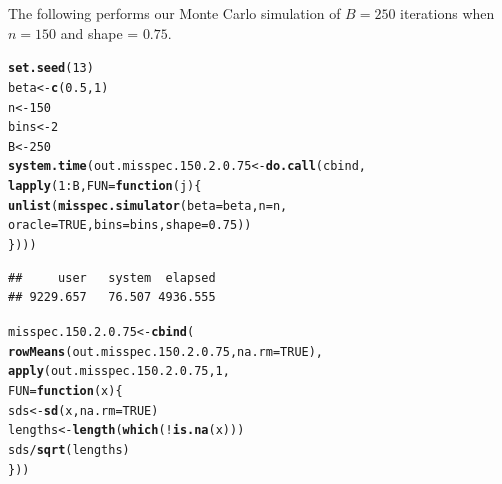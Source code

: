 \documentclass[11pt]{article}\usepackage[]{graphicx}\usepackage[]{color}
\makeatletter
\newcommand{\hlnum}[1]{\textcolor[rgb]{0.686,0.059,0.569}{#1}}%
\newcommand{\hlopt}[1]{\textcolor[rgb]{0,0,0}{#1}}%
\newcommand{\hlstd}[1]{\textcolor[rgb]{0.345,0.345,0.345}{#1}}%
\newcommand{\hlkwa}[1]{\textcolor[rgb]{0.161,0.373,0.58}{\textbf{#1}}}%
\newcommand{\hlkwb}[1]{\textcolor[rgb]{0.69,0.353,0.396}{#1}}%
\newcommand{\hlkwc}[1]{\textcolor[rgb]{0.333,0.667,0.333}{#1}}%
\newcommand{\hlkwd}[1]{\textcolor[rgb]{0.737,0.353,0.396}{\textbf{#1}}}%
\newenvironment{kframe}{%
 \def\at@end@of@kframe{}%
 \ifinner\ifhmode%
  \def\at@end@of@kframe{\end{minipage}}%
  \begin{minipage}{\columnwidth}%
 \fi\fi%
 \def\FrameCommand##1{\hskip\@totalleftmargin \hskip-\fboxsep
 \colorbox{shadecolor}{##1}\hskip-\fboxsep
     \hskip-\linewidth \hskip-\@totalleftmargin \hskip\columnwidth}%
 \MakeFramed {\advance\hsize-\width
   \@totalleftmargin\z@ \linewidth\hsize
   \@setminipage}}%
 {\par\unskip\endMakeFramed%
 \at@end@of@kframe}
\newenvironment{knitrout}{}{} %
\makeatother
\begin{document}

The following performs our Monte Carlo simulation of $B = 250$ iterations 
when $n = 150$ and shape = $0.75$.

\begin{knitrout}
\color{fgcolor}\begin{kframe}
\begin{alltt}
\hlkwd{set.seed}\hlstd{(}\hlnum{13}\hlstd{)}
\hlstd{beta} \hlkwb{<-} \hlkwd{c}\hlstd{(}\hlnum{0.5}\hlstd{,} \hlnum{1}\hlstd{)}
\hlstd{n} \hlkwb{<-} \hlnum{150}
\hlstd{bins} \hlkwb{<-} \hlnum{2}
\hlstd{B} \hlkwb{<-} \hlnum{250}
\hlkwd{system.time}\hlstd{(out.misspec.150.2.0.75} \hlkwb{<-} \hlkwd{do.call}\hlstd{(cbind,}
  \hlkwd{lapply}\hlstd{(}\hlnum{1}\hlopt{:}\hlstd{B,} \hlkwc{FUN} \hlstd{=} \hlkwa{function}\hlstd{(}\hlkwc{j}\hlstd{)\{}
    \hlkwd{unlist}\hlstd{(}\hlkwd{misspec.simulator}\hlstd{(}\hlkwc{beta} \hlstd{= beta,} \hlkwc{n} \hlstd{= n,}
      \hlkwc{oracle} \hlstd{=} \hlnum{TRUE}\hlstd{,} \hlkwc{bins} \hlstd{= bins,} \hlkwc{shape} \hlstd{=} \hlnum{0.75}\hlstd{))}
\hlstd{\})))}
\end{alltt}
\begin{verbatim}
##     user   system  elapsed 
## 9229.657   76.507 4936.555
\end{verbatim}
\end{kframe}
\end{knitrout}

\begin{knitrout}
\color{fgcolor}\begin{kframe}
\begin{alltt}
\hlstd{misspec.150.2.0.75} \hlkwb{<-} \hlkwd{cbind}\hlstd{(}
  \hlkwd{rowMeans}\hlstd{(out.misspec.150.2.0.75,} \hlkwc{na.rm} \hlstd{=} \hlnum{TRUE}\hlstd{),}
  \hlkwd{apply}\hlstd{(out.misspec.150.2.0.75,} \hlnum{1}\hlstd{,}
  \hlkwc{FUN} \hlstd{=} \hlkwa{function}\hlstd{(}\hlkwc{x}\hlstd{)\{}
    \hlstd{sds} \hlkwb{<-} \hlkwd{sd}\hlstd{(x,} \hlkwc{na.rm} \hlstd{=} \hlnum{TRUE}\hlstd{)}
    \hlstd{lengths} \hlkwb{<-} \hlkwd{length}\hlstd{(}\hlkwd{which}\hlstd{(}\hlopt{!}\hlkwd{is.na}\hlstd{(x)))}
    \hlstd{sds} \hlopt{/} \hlkwd{sqrt}\hlstd{(lengths)}
  \hlstd{\}))}
\end{alltt}
\end{kframe}
\end{knitrout}
\end{document}
